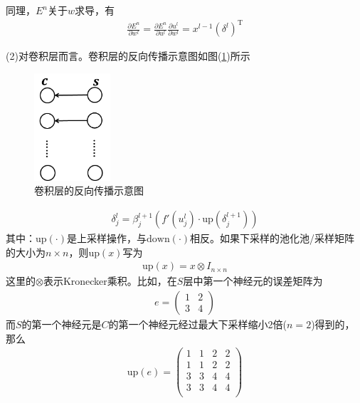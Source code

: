             同理，$E^n$关于$w$求导，有
            \begin{align*}
            \frac{\partial E^n}{\partial w^l} = \frac{\partial E^n}{\partial u^l}\frac{\partial u^l}{\partial w^l} = x^{l-1}(\delta^l)^\mathrm{T}
            \end{align*}
            \par
            (2)对卷积层而言。卷积层的反向传播示意图如图(\ref{fig:卷积层的反向传播示意图})所示
            \begin{figure}[H]
            \centering
            \includegraphics[height=4cm]{images/The_reverse_propagation_of_the_convolution_layer.jpg}
            \caption{卷积层的反向传播示意图}
            \label{fig:卷积层的反向传播示意图}
            \end{figure}
            \begin{align*}
            \delta_j^l = \beta_j^{l+1} \left( f'(u_j^l)\cdot \mathrm{up}(\delta_j^{l+1}) \right)
            \end{align*}
            其中：$\mathrm{up}(\cdot)$是上采样操作，与$\mathrm{down}(\cdot)$相反。如果下采样的池化池/采样矩阵的大小为$n\times n$，则$\mathrm{up}(x)$写为
            \begin{align*}
            \mathrm{up}(x) = x \otimes I_{n\times n}
            \end{align*}
            这里的$\otimes $表示Kronecker乘积。比如，在$S$层中第一个神经元的误差矩阵为
            \begin{align*}
            e=
            \begin{pmatrix}
            1 & 2\\
            3 & 4
            \end{pmatrix}
            \end{align*}
            而$S$的第一个神经元是$C$的第一个神经元经过最大下采样缩小2倍($n=2$)得到的，那么
            \begin{align*}
            \mathrm{up}(e) =
            \begin{pmatrix}
            1 & 1 & 2 & 2\\
            1 & 1 & 2 & 2\\
            3 & 3 & 4 & 4\\
            3 & 3 & 4 & 4\\
            \end{pmatrix}
            \end{align*}
